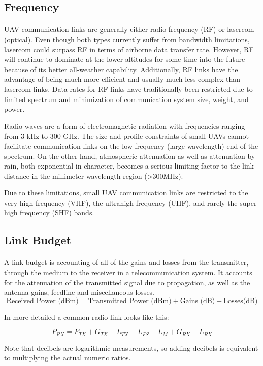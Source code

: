 \subsection*{Frequency}
\paragraph{}
UAV communication links are generally either radio frequency (RF) or lasercom (optical). Even though both types currently suffer from bandwidth limitations, lasercom could surpass RF in terms of airborne data transfer rate. However, RF will continue to dominate at the lower altitudes for some time into the future because of its better all-weather capability. Additionally, RF links have the advantage of being much more efficient and usually much less complex than lasercom links.
Data rates for RF links have traditionally been restricted due to limited spectrum and
minimization of communication system size, weight, and power.

Radio waves are a form of electromagnetic radiation with frequencies ranging from 3 kHz to 300 GHz. The size and profile constraints of small UAVs cannot facilitate communication links on the low-frequency (large wavelength) end of the spectrum. 
On the other hand, atmospheric attenuation as well as attenuation by rain, both
exponential in character, becomes a serious limiting factor to the link distance in
the millimeter wavelength region (>300MHz). 
	
Due to these limitations, small UAV communication links are restricted to the very high frequency (VHF), the ultrahigh frequency (UHF), and rarely the super-high frequency (SHF) bands.

\subsection*{Link Budget}
\paragraph{}
A link budget is accounting of all of the gains and losses from the transmitter, through the medium  to the receiver in a telecommunication system. It accounts for the attenuation of the transmitted signal due to propagation, as well as the antenna gains, feedline and miscellaneous losses. 
\begin{equation*}\label{eq:link_budget} 
 		\text{Received Power (dBm)} = \text{Transmitted Power (dBm)} + \text{Gains (dB)} - \text{Losses(dB)}
\end{equation*}

In more detailed a common radio link looks like this:

\begin{equation*}\label{eq:link_budget} 
 		P_{RX} = P_{TX} + G_{TX} - L_{TX} - L_{FS} - L_{M} + G_{RX} - L_{RX}
\end{equation*}

Note that decibels are logarithmic measurements, so adding decibels is equivalent to multiplying the actual numeric ratios.
